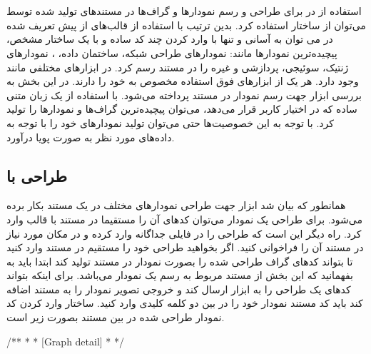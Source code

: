%
% 
% 
% 
%
% 
% 
% 
%

\section{}
استفاده از  در  
برای طراحی و رسم نمودارها و گراف‌ها در مستندهای تولید شده توسط  می‌توان از ساختار  استفاده کرد. بدین ترتیب با استفاده از قالب‌های از پیش تعریف شده در  می توان به آسانی و تنها با وارد کردن چند کد ساده و با یک  ساختار مشخص، پیچیده‌ترین نمودارها مانند: نمودارهای طراحی شبکه، ساختمان داده،  ، نمودارهای ژنتیک، سوئیجی، پردازشی و غیره را در مستند رسم کرد.
در  ابزارهای مختلفی مانند  وجود دارد. هر یک از ابزارهای فوق استفاده مخصوص به خود را دارند. در این بخش به بررسی ابزار  جهت رسم نمودار در مستند پرداخته می‌شود. با استفاده از یک زبان متنی ساده که  در اختیار کاربر قرار می‌دهد، می‌توان پیچیده‌ترین گراف‌ها و نمودارها را تولید کرد. با توجه به این خصوصیت‌ها حتی می‌توان تولید نمودارهای خود را با توجه به داده‌های مورد نظر به صورت پویا درآورد.

\subsection{طراحی با }
همانطور که بیان شد ابزار  جهت طراحی نمودارهای مختلف در یک مستند بکار برده می‌شود. برای طراحی یک نمودار می‌توان کدهای آن را مستقیما در مستند با قالب  وارد کرد. راه دیگر این است که طراحی را در فایلی جداگانه وارد کرده و در مکان مورد نیاز در مستند آن را فراخوانی کنید.
اگر بخواهید طراحی خود را مستقیم در مستند وارد کنید تا  بتواند کدهای گراف طراحی شده را بصورت نمودار در مستند تولید کند ابتدا باید به  بفهمانید که این بخش از مستند مربوط به رسم یک نمودار می‌باشد. برای اینکه  بتواند کدهای یک طراحی را به ابزار  ارسال کند و خروجی تصویر نمودار را به مستند اضافه کند باید کد مستند نمودار خود را در بین دو کلمه کلیدی
وارد کنید. ساختار وارد کردن کد نمودار طراحی شده در بین مستند بصورت زیر است.
\begin{C++}
/**
 * \dot
 * [Graph detail]
 * \enddot
 */
\end{C++}

